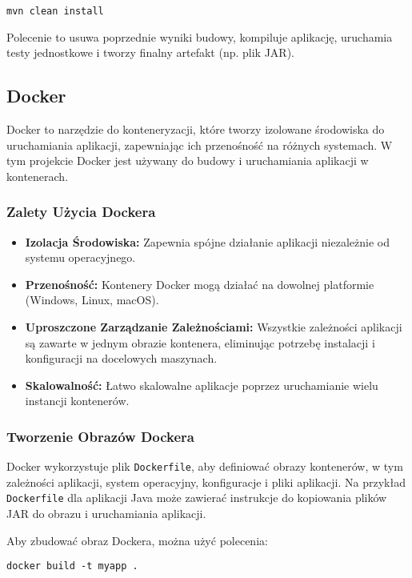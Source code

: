 \begin{verbatim}
mvn clean install
\end{verbatim}

Polecenie to usuwa poprzednie wyniki budowy, kompiluje aplikację, uruchamia testy jednostkowe i tworzy finalny artefakt (np. plik JAR).

\subsection{Docker}

Docker to narzędzie do konteneryzacji, które tworzy izolowane środowiska do uruchamiania aplikacji, zapewniając ich przenośność na różnych systemach. W tym projekcie Docker jest używany do budowy i uruchamiania aplikacji w kontenerach.

\subsubsection{Zalety Użycia Dockera}

\begin{itemize}
    \item \textbf{Izolacja Środowiska:} Zapewnia spójne działanie aplikacji niezależnie od systemu operacyjnego.
    \item \textbf{Przenośność:} Kontenery Docker mogą działać na dowolnej platformie (Windows, Linux, macOS).
    \item \textbf{Uproszczone Zarządzanie Zależnościami:} Wszystkie zależności aplikacji są zawarte w jednym obrazie kontenera, eliminując potrzebę instalacji i konfiguracji na docelowych maszynach.
    \item \textbf{Skalowalność:} Łatwo skalowalne aplikacje poprzez uruchamianie wielu instancji kontenerów.
\end{itemize}

\subsubsection{Tworzenie Obrazów Dockera}

Docker wykorzystuje plik \texttt{Dockerfile}, aby definiować obrazy kontenerów, w tym zależności aplikacji, system operacyjny, konfiguracje i pliki aplikacji. Na przykład \texttt{Dockerfile} dla aplikacji Java może zawierać instrukcje do kopiowania plików JAR do obrazu i uruchamiania aplikacji.

Aby zbudować obraz Dockera, można użyć polecenia:

\begin{verbatim}
docker build -t myapp .
\end{verbatim}

